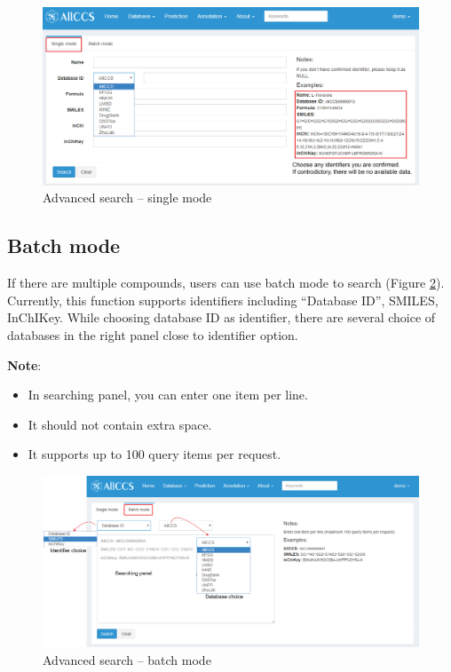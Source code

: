 \documentclass[12pt,]{book}
\providecommand{\tightlist}{%
  \setlength{\itemsep}{0pt}\setlength{\parskip}{0pt}}
\theoremstyle{definition}
\theoremstyle{definition}
\theoremstyle{definition}
\theoremstyle{remark}
\begin{document}
\begin{figure}

{\centering \includegraphics{images/chapter2/figure2.8advance_search_single} 

}

\caption{Advanced search – single mode}\label{fig:figure2d8}
\end{figure}

\subsection{Batch mode}\label{chapter2d3d2}

If there are multiple compounds, users can use batch mode to search
(Figure \ref{fig:figure2d9}). Currently, this function supports
identifiers including ``Database ID'', SMILES, InChIKey. While choosing
database ID as identifier, there are several choice of databases in the
right panel close to identifier option.

\textbf{Note}:

\begin{itemize}
\tightlist
\item
  In searching panel, you can enter one item per line.
\item
  It should not contain extra space.
\item
  It supports up to 100 query items per request.
\end{itemize}

\begin{figure}

{\centering \includegraphics{images/chapter2/figure2.9advance_search_batch} 

}

\caption{Advanced search – batch mode}\label{fig:figure2d9}
\end{figure}
\end{document}
